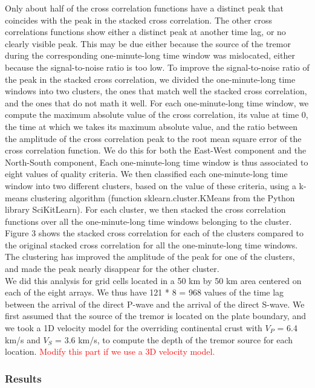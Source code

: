 \documentclass[letterpaper, 12pt]{article}
\begin{document}
Only about half of the cross correlation functions have a distinct peak that coincides with the peak in the stacked cross correlation. The other cross correlations functions show either a distinct peak at another time lag, or no clearly visible peak. This may be due either because the source of the tremor during the corresponding one-minute-long time window was mislocated, either because the signal-to-noise ratio is too low. To improve the signal-to-noise ratio of the peak in the stacked cross correlation, we divided the one-minute-long time windows into two clusters, the ones that match well the stacked cross correlation, and the ones that do not math it well. For each one-minute-long time window, we compute the maximum absolute value of the cross correlation, its value at time 0, the time at which we takes its maximum absolute value, and the ratio between the
amplitude of the cross correlation peak to the root mean square error of the cross correlation function. We do this for both the East-West component and the North-South component, Each one-minute-long time window is thus associated to eight values of quality criteria. We then classified each one-minute-long time window into two different clusters, based on the value of these criteria, using a k-means clustering algorithm (function sklearn.cluster.KMeans from the Python library SciKitLearn). For each cluster, we then stacked the cross correlation functions over all the one-minute-long time windows belonging to the cluster. Figure 3 shows the stacked cross correlation for each of the clusters compared to the original stacked cross correlation for all the one-minute-long time windows. The clustering has improved the amplitude of the peak for one of the clusters, and made the peak nearly disappear for the other cluster. \\

We did this analysis for grid cells located in a 50 km by 50 km area centered on each of the eight arrays. We thus have 121 * 8 = 968 values of the time lag between the arrival of the direct P-wave and the arrival of the direct S-wave. We first assumed that the source of the tremor is located on the plate boundary, and we took a 1D velocity model for the overriding continental crust with $V_P$ = 6.4 km/s and $V_S$ = 3.6 km/s, to compute the depth of the tremor source for each location. \textcolor{red}{Modify this part if we use a 3D velocity model.}

\subsubsection{Results}
\end{document}
